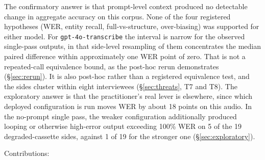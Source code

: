 \documentclass[11pt]{article}
\begin{document}
The confirmatory answer is that prompt-level context produced no detectable change in aggregate accuracy on this corpus. None of the four registered hypotheses (WER, entity recall, full-vs-structure, over-biasing) was supported for either model. For \texttt{gpt-4o-transcribe} the interval is narrow for the observed single-pass outputs, in that side-level resampling of them concentrates the median paired difference within approximately one WER point of zero. That is not a repeated-call equivalence bound, as the post-hoc rerun demonstrates (\S\ref{sec:rerun}). It is also post-hoc rather than a registered equivalence test, and the sides cluster within eight interviewees (\S\ref{sec:threats}, T7 and T8). The exploratory answer is that the practitioner's real lever is elsewhere, since which deployed configuration is run moves WER by about 18 points on this audio. In the no-prompt single pass, the weaker configuration additionally produced looping or otherwise high-error output exceeding 100\% WER on 5 of the 19 degraded-cassette sides, against 1 of 19 for the stronger one (\S\ref{sec:exploratory}).

Contributions:
\end{document}
